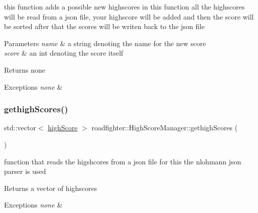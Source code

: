 this function adds a possible new highscores in this function all the highscores will be read from a json file, your highscore will be added and then the score will be sorted after that the scores will be writen back to the json file 
\begin{DoxyParams}{Parameters}
{\em name} & a string denoting the name for the new score \\
\hline
{\em score} & an int denoting the score itself \\
\hline
\end{DoxyParams}
\begin{DoxyReturn}{Returns}
none 
\end{DoxyReturn}

\begin{DoxyExceptions}{Exceptions}
{\em none} & \\
\hline
\end{DoxyExceptions}
\mbox{\label{classroadfighter_1_1HighScoreManager_af5f73f94d50829ec3f13792c5fbb33bb}} 
\subsubsection{\texorpdfstring{gethigh\+Scores()}{gethighScores()}}
{\footnotesize\ttfamily std\+::vector$<$ \hyperlink{structroadfighter_1_1highScore}{high\+Score} $>$ roadfighter\+::\+High\+Score\+Manager\+::gethigh\+Scores (\begin{DoxyParamCaption}{ }\end{DoxyParamCaption})\hspace{0.3cm}{\ttfamily [static]}}

function that reads the higshcores from a json file for this the nlohmann json parser is used \begin{DoxyReturn}{Returns}
a vector of highscores 
\end{DoxyReturn}

\begin{DoxyExceptions}{Exceptions}
{\em none} & \\
\hline
\end{DoxyExceptions}
\mbox{\label{classroadfighter_1_1HighScoreManager_aa3b964a1c4631093aa2542a0cd8c4f00}} 
